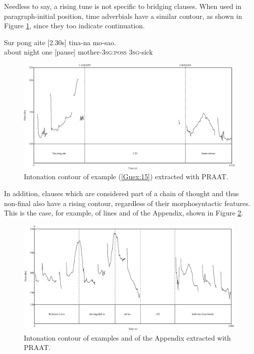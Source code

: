 \documentclass[output=paper]{LSP/langsci}
\begin{document}
Needless to say, a rising tune is not specific to bridging clauses. When used in paragraph-initial position, time adverbials have a similar  contour, as shown in Figure \ref{GuF5}, since they too indicate continuation. 

\begin{exe}
\ex \label{Guex:15}
\gll Sur     pong  aite [2.30s]   tina-na                mo-sao.\\     
about   night one      [pause]   mother-\textsc{3sg:poss}   \textsc{3sg}-sick \\
\glt {} 
\end{exe}

\begin{figure}[ht]
\includegraphics[width=4.8in]{figures/guerinFig5x.eps}
\caption{Intonation contour of example (\ref{Guex:15}) extracted with PRAAT. \label{GuF5}}
\end{figure}

In addition, clauses which are considered part of a chain of thought and thus non-final also have a rising  contour, regardless of their morphosyntactic features. This is the case, for example, of lines   and  of the Appendix, shown in Figure \ref{GuF9}.

\begin{figure}[ht]
\includegraphics[width=4.8in]{figures/guerinFig9.eps}
\caption{Intonation contour of examples  and  of the Appendix extracted with PRAAT. \label{GuF9}}
\end{figure}
\end{document}
